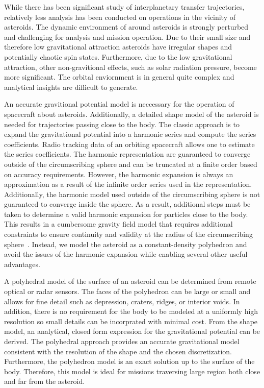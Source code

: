 \documentclass[]{aiaa-tc}%
\begin{document}
While there has been significant study of interplanetary transfer trajectories, relatively less analysis has been conducted on operations in the vicinity of asteroids.
The dynamic environment of around asteroids is strongly perturbed and challenging for analysis and mission operation.
Due to their small size and therefore low gravitational attraction asteroids have irregular shapes and potentially chaotic spin states.
Furthermore, due to the low gravitational attraction, other non-gravitional effects, such as solar radiation pressure, become more significant.
The orbital enviornment is in general quite complex and analytical insights are difficult to generate.

An accurate gravitional potential model is neccessary for the operation of spacecraft about asteroids.
Additionally, a detailed shape model of the asteroid is needed for trajectories passing close to the body.
The classic approach is to expand the gravitational potential into a harmonic series and compute the series coefficients.
Radio tracking data of an orbiting spacecraft allows one to estimate the series coefficients.
The harmonic representation are guaranteed to converge outside of the circumscribing sphere and can be truncated at a finite order based on accuracy requirements.
However, the harmonic expansion is always an approximation as a result of the infinite order series used in the representation.
Additionally, the harmonic model used outside of the circumscribing sphere is not guaranteed to converge inside the sphere.
As a result, additional steps must be taken to determine a valid harmonic expansion for particles close to the body. 
This results in a cumbersome gravity field model that requires additional constraints to ensure continuity and validity at the radius of the circumscribing sphere~\cite{werner1996}.
Instead, we model the asteroid as a constant-density polyhedron and avoid the issues of the harmonic expansion while enabling several other useful advantages.

A polyhedral model of the surface of an asteroid can be determined from remote optical or radar sensors.
The faces of the polyhedron can be large or small and allows for fine detail such as depression, craters, ridges, or interior voids. 
In addition, there is no requirement for the body to be modeled at a uniformly high resolution so small details can be incorprated with minimal cost.
From the shape model, an analytical, closed form expression for the gravitational potential can be derived.
The polyhedral approach provides an accurate gravitational model consistent with the resolution of the shape and the chosen discretization.
Furthermore, the polyhedron model is an exact solution up to the surface of the body. 
Therefore, this model is ideal for missions traversing large region both close and far from the asteroid.
\end{document}
